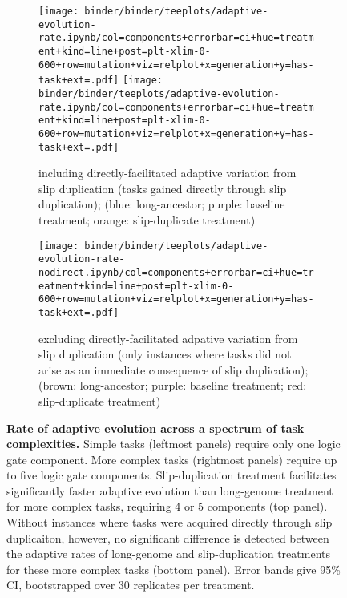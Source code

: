 \begin{figure*}
    \centering
    \begin{subfigure}{\textwidth}
    \texttt{[image: binder/binder/teeplots/adaptive-evolution-rate.ipynb/col=components+errorbar=ci+hue=treatment+kind=line+post=plt-xlim-0-600+row=mutation+viz=relplot+x=generation+y=has-task+ext=.pdf]}
\texttt{[image: binder/binder/teeplots/adaptive-evolution-rate.ipynb/col=components+errorbar=ci+hue=treatment+kind=line+post=plt-xlim-0-600+row=mutation+viz=relplot+x=generation+y=has-task+ext=.pdf]}
    \caption{\footnotesize including directly-facilitated adaptive variation from slip duplication (tasks gained directly through slip duplication); (blue: long-ancestor; purple: baseline treatment; orange: slip-duplicate treatment)}
    \label{fig:adaptive-evolution-rate:direct}
    \end{subfigure}

    \begin{subfigure}{\textwidth}
\texttt{[image: binder/binder/teeplots/adaptive-evolution-rate-nodirect.ipynb/col=components+errorbar=ci+hue=treatment+kind=line+post=plt-xlim-0-600+row=mutation+viz=relplot+x=generation+y=has-task+ext=.pdf]}
    \caption{\footnotesize excluding directly-facilitated adpative variation from slip duplication (only instances where tasks did not arise as an immediate consequence of slip duplication); (brown: long-ancestor; purple: baseline treatment; red: slip-duplicate treatment)}
    \label{fig:adaptive-evolution-rate:nodirect}
    \end{subfigure}
    \caption{
        \textbf{Rate of adaptive evolution across a spectrum of task complexities.}
        \footnotesize
        Simple tasks (leftmost panels) require only one logic gate component.
        More complex tasks (rightmost panels) require up to five logic gate components.
        Slip-duplication treatment facilitates significantly faster adaptive evolution than long-genome treatment for more complex tasks, requiring 4 or 5 components (top panel).
        Without instances where tasks were acquired directly through slip duplicaiton, however, no significant difference is detected between the adaptive rates of long-genome and slip-duplication treatments for these more complex tasks (bottom panel).
        Error bands give 95\% CI, bootstrapped over 30 replicates per treatment.
    }
    \label{fig:adaptive-evolution-rate}
\end{figure*}
